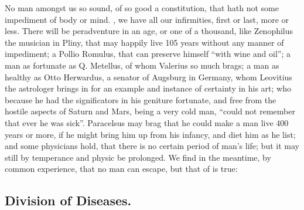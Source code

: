 No man amongst us so sound, of so good a constitution, that hath not some
impediment of body or mind. , we have all our
infirmities, first or last, more or less. There will be peradventure in an age,
or one of a thousand, like Zenophilus the musician in
Pliny, that may happily live 105 years without any manner
of impediment; a Pollio Romulus, that can preserve himself
\enquote{with wine and oil}; a man as fortunate as Q. Metellus, of
whom Valerius so much brags; a man as healthy as Otto Herwardus, a senator of
Augsburg in Germany, whom Leovitius the astrologer brings
in for an example and instance of certainty in his art; who because he had the
significators in his geniture fortunate, and free from the hostile aspects of
Saturn and Mars, being a very cold man, \enquote{could not remember
that ever he was sick}. Paracelsus may brag that he could
make a man live 400 years or more, if he might bring him up from his infancy,
and diet him as he list; and some physicians hold, that there is no certain
period of man's life; but it may still by temperance and physic be prolonged.
We find in the meantime, by common experience, that no man can escape, but that
of \Hesiod{} is true:


\subsection{Division of Diseases.}

